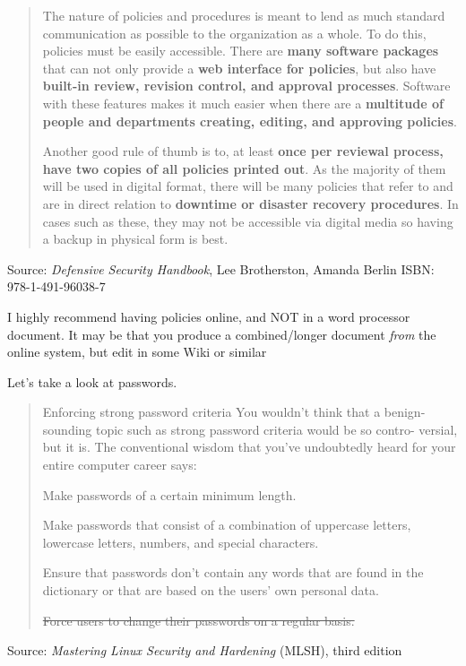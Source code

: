 \documentclass[Screen16to9,17pt]{foils}
\begin{document}


\begin{quote}
The nature of policies and procedures is meant to lend as much standard communication as possible to the organization as a whole. To do this, policies must be easily accessible. There are {\bf many software packages} that can not only provide a {\bf web interface for policies}, but also have {\bf built-in review, revision control, and approval processes}. Software with these features makes it much easier when there are a {\bf multitude of people and departments creating, editing, and approving policies}.

Another good rule of thumb is to, at least {\bf once per reviewal process, have two copies of all policies printed out}. As the majority of them will be used in digital format, there will be many policies that refer to and are in direct relation to {\bf downtime or disaster recovery procedures}. In cases such as these, they may not be accessible via digital media so having a backup in physical form is best.
\end{quote}
Source: \emph{Defensive Security Handbook}, Lee Brotherston, Amanda Berlin ISBN: 978-1-491-96038-7

\begin{list2}
\item I highly recommend having policies online, and NOT in a word processor document. It may be that you produce a combined/longer document \emph{from} the online system, but edit in some Wiki or similar
\end{list2}



Let's take a look at passwords.

\begin{quote}
Enforcing strong password criteria
You wouldn’t think that a benign-sounding topic such as strong password criteria would be so contro-
versial, but it is. The conventional wisdom that you’ve undoubtedly heard for your entire computer
career says:
\begin{list2}
\item Make passwords of a certain minimum length.
\item Make passwords that consist of a combination of uppercase letters, lowercase letters, numbers,
and special characters.
\item Ensure that passwords don’t contain any words that are found in the dictionary or that are
based on the users’ own personal data.
\item \sout{Force users to change their passwords on a regular basis.}
\end{list2}
\end{quote}
Source: \emph{Mastering Linux Security and Hardening} (MLSH), third edition
\end{document}
